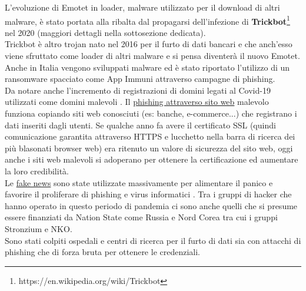 L'evoluzione di Emotet in loader, malware utilizzato per il download di altri malware, è stato portata alla ribalta dal propagarsi dell'infezione di \textbf{Trickbot}\footnote{https://en.wikipedia.org/wiki/Trickbot} nel 2020 (maggiori dettagli nella sottosezione  dedicata).\\
Trickbot è altro trojan nato nel 2016 per il furto di dati bancari e che anch'esso viene sfruttato come loader di altri malware e si pensa diventerà il nuovo Emotet.\\
Anche in Italia vengono sviluppati malware ed è stato riportato l'utilizzo di un ransomware spacciato come App Immuni attraverso campagne di phishing.\\
Da notare anche l'incremento di registrazioni di domini legati al Covid-19 utilizzati come domini malevoli \cite{covid19domainnames}.
Il \underline{phishing attraverso sito web} malevolo funziona copiando siti web conosciuti (es: banche, e-commerce...) che registrano i dati inseriti dagli utenti.
Se qualche anno fa avere il certificato \acrfull{SSL} (quindi comunicazione garantita attraverso HTTPS e lucchetto nella barra di ricerca dei più blasonati browser web) era ritenuto un valore di sicurezza del sito web, oggi anche i siti web malevoli si adoperano per ottenere la certificazione ed aumentare la loro credibilità.\\
Le \underline{fake news} sono state utilizzate massivamente per alimentare il panico e favorire il proliferare di phishing e virus informatici \cite{fakenewscovid19}.
Tra i gruppi di hacker che hanno operato in questo periodo di pandemia ci sono anche quelli che si presume essere finanziati da Nation State come Russia e Nord Corea tra cui i gruppi Stronzium e NKO.\\
Sono stati colpiti ospedali e centri di ricerca per il furto di dati sia con attacchi di phishing che di forza bruta per ottenere le credenziali.

